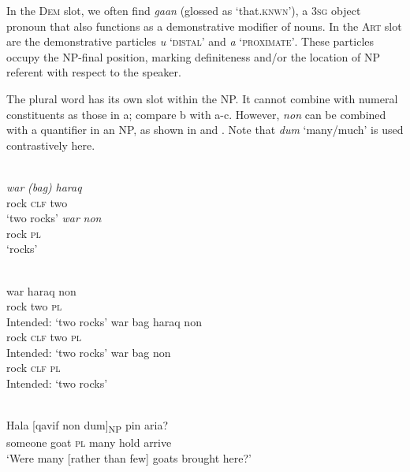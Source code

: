 In the \textsc{Dem} slot, we often find \textit{ga}\textit{{\textglotstop}}\textit{an} (glossed as `that.\textsc{knwn}'), a 3\textsc{sg} object pronoun that also functions as a demonstrative modifier of nouns. In the \textsc{Art} slot are the demonstrative particles \textit{u} `\textsc{distal'} and \textit{a} `\textsc{proximate'}. These particles occupy the NP-final position, marking definiteness and/or the location of NP referent with respect to the speaker.

The plural word has its own slot within the NP. It cannot combine with numeral constituents as those in a; compare b with a-c. However, \textit{non} can be combined with a quantifier in an NP, as shown in  and . Note that \textit{dum} `many/much' is used contrastively here.


\ea%
\label{ex:9:21}
 \\
\ea
\gll \textit{war} \textit{(bag)} \textit{haraq}  \\
  rock \textsc{clf} two \\
\glt `two rocks'
\ex
\gll \textit{war} \textit{non}\\
  rock \textsc{pl}\\
 `rocks'
\z
\z


\ea%
\label{ex:9:22}
 \\
\ea
\gll  *war haraq non \\
  rock two \textsc{pl}   \\
\glt Intended: `two rocks'
\ex
\gll *war bag haraq non \\
  rock \textsc{clf} two \textsc{pl}   \\
\glt  Intended: `two rocks'
\ex
\gll *war bag non \\
   rock \textsc{clf} \textsc{pl}  \\
\glt Intended: `two rocks'
\z
\z





\ea%
\label{ex:9:23}
 \\
\gll Hala [{qavif} non {dum}]\textsubscript{NP} pin aria{{\textglotstop}}{?} \\
  someone goat \textsc{pl} many hold arrive   \\
\glt `Were many [rather than few] goats brought here?'
\z







